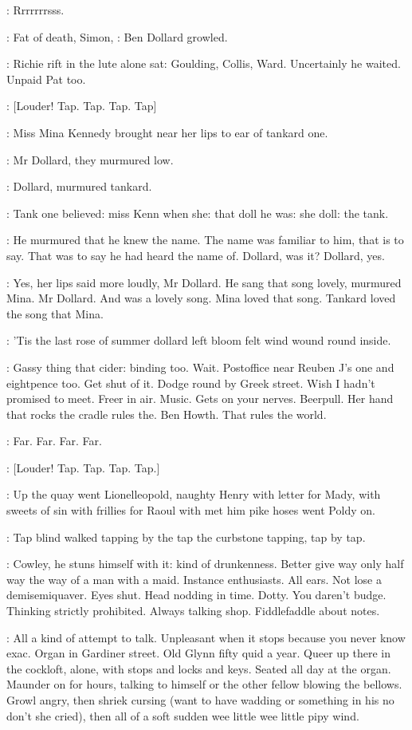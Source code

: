 \BloomInt:
Rrrrrrrsss.

\dollard:
Fat of death,
Simon,
:
Ben Dollard growled.

:
Richie rift in the lute alone sat:
Goulding,
Collis,
Ward.
Uncertainly
he waited.
Unpaid Pat too.

\stripling:
[Louder!
Tap.
Tap.
Tap.
Tap]

:
Miss Mina Kennedy brought near her lips to ear of tankard one.

:
Mr Dollard,
they murmured low.

:
Dollard,
murmured tankard.

:
Tank one believed:
miss Kenn when she:
that doll he was:
she doll:
the tank.

:
He murmured that he knew the name.
The name was familiar to him,
that is to say.
That was to say he had heard the name of.
Dollard,
was it?
Dollard,
yes.

:
Yes,
her lips said more loudly,
Mr Dollard.
He sang that song lovely,
murmured Mina.
Mr Dollard.
And
 was a lovely
song.
Mina loved that song.
Tankard loved the song that Mina.

:
'Tis the last rose of summer dollard left bloom felt wind wound round
inside.

\BloomInt:
Gassy thing that cider:
binding too.
Wait.
Postoffice near Reuben J's
one and eightpence too.
Get shut of it.
Dodge round by Greek street.
Wish
I hadn't promised to meet.
Freer in air.
Music.
Gets on your nerves.
Beerpull.
Her hand that rocks the cradle rules the.
Ben Howth.
That rules
the world.

:
Far.
Far.
Far.
Far.

\stripling:
[Louder!
Tap.
Tap.
Tap.
Tap.]

:
Up the quay went Lionelleopold,
naughty Henry with letter for
Mady,
with sweets of sin with frillies for Raoul with met him pike hoses
went Poldy on.

:
Tap blind walked
tapping by the tap the curbstone tapping,
tap by tap.

\BloomInt:
Cowley,
he stuns himself with it:
kind of drunkenness.
Better give
way only half way the way of a man with a maid.
Instance enthusiasts.
All
ears.
Not lose a demisemiquaver.
Eyes shut.
Head nodding in time.
Dotty.
You daren't budge.
Thinking strictly prohibited.
Always talking shop.
Fiddlefaddle about notes.

\BloomInt:
All a kind of attempt to talk.
Unpleasant when it stops because you
never know exac.
Organ in Gardiner street.
Old Glynn fifty quid a year.
Queer up there in the cockloft,
alone,
with stops and locks and keys.
Seated all day at the organ.
Maunder on for hours,
talking to himself or
the other fellow blowing the bellows.
Growl angry,
then shriek cursing
(want to have wadding or something in his no don't she cried),
then all of
a soft sudden wee little wee little pipy wind.

